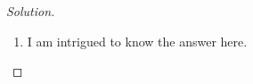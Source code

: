 \begin{proof}[Solution]
\begin{enumerate}[label=\alph*.]
\item I am intrigued to know the answer here.	
\end{enumerate}
\end{proof}

\printbibliography








